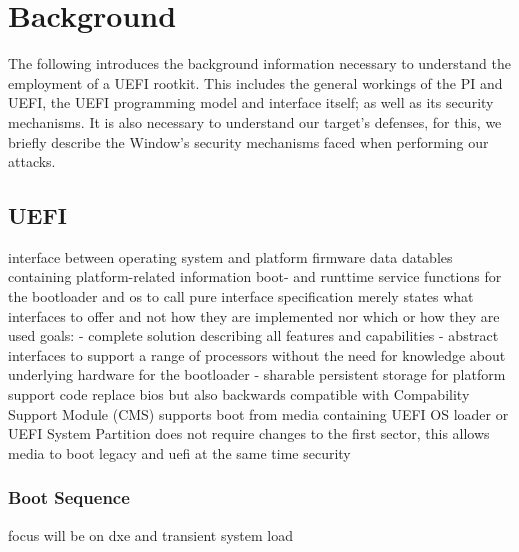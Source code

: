 
\chapter{Background}

The following introduces the background information necessary to understand the employment of a \ac{UEFI} rootkit. This includes the general workings of the \acf{PI} and \ac{UEFI}, the \ac{UEFI} programming model and interface itself; as well as its security mechanisms. It is also necessary to understand our target's defenses, for this, we briefly describe the Window's security mechanisms faced when performing our attacks.

\section{\acf{UEFI}}

interface between operating system and platform firmware
data datables containing platform-related information
boot- and runttime service functions for the bootloader and os to call
pure interface specification
merely states what interfaces to offer and not how they are implemented nor which or how they are used
goals:
- complete solution describing all features and capabilities
- abstract interfaces to support a range of processors without the need for knowledge about underlying hardware for the bootloader
- sharable persistent storage for platform support code
replace bios but also backwards compatible with Compability Support Module (CMS)
supports boot from media containing UEFI OS loader or UEFI System Partition
does not require changes to the first sector, this allows media to boot legacy and uefi at the same time
security

\subsection{Boot Sequence}

focus will be on dxe and transient system load

